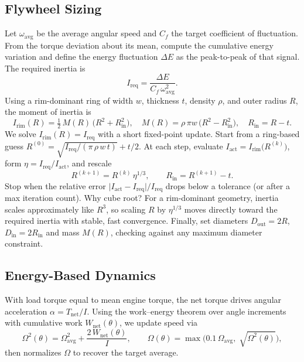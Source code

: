 \documentclass[12pt]{article}
\begin{document}
\subsection{Flywheel Sizing}
Let \(\omega_{\!\text{avg}}\) be the average angular speed and \(C_{f}\) the target coefficient of fluctuation. From the torque deviation about its mean, compute the cumulative energy variation and define the energy fluctuation \(\Delta E\) as the peak-to-peak of that signal. The required inertia is
\begin{equation}
  I_{\mathrm{req}} = \frac{\Delta E}{C_{f}\,\omega_{\!\text{avg}}^{2}}.
\end{equation}
Using a rim-dominant ring of width \(w\), thickness \(t\), density \(\rho\), and outer radius \(R\), the moment of inertia is
\begin{equation}
  I_{\mathrm{rim}}(R) = \tfrac{1}{2}\,M(R)\,\bigl(R^{2}+R_{\mathrm{in}}^{2}\bigr),\quad M(R)=\rho\,\pi w\,\bigl(R^{2}-R_{\mathrm{in}}^{2}\bigr),\quad R_{\mathrm{in}}=R-t.
\end{equation}
We solve \(I_{\mathrm{rim}}(R)=I_{\mathrm{req}}\) with a short fixed-point update. Start from a ring-based guess
\(R^{(0)} = \sqrt{I_{\mathrm{req}}/(\pi\,\rho\,w\,t)} + t/2\). At each step, evaluate
\(I_{\mathrm{act}} = I_{\mathrm{rim}}\bigl(R^{(k)}\bigr)\), form \(\eta = I_{\mathrm{req}}/I_{\mathrm{act}}\), and rescale
\begin{equation}
  R^{(k+1)} = R^{(k)}\,\eta^{1/3},\qquad R_{\mathrm{in}}=R^{(k+1)}-t.
\end{equation}
Stop when the relative error \(\lvert I_{\mathrm{act}}-I_{\mathrm{req}}\rvert/I_{\mathrm{req}}\) drops below a tolerance (or after a max iteration count).
Why cube root? For a rim-dominant geometry, inertia scales approximately like \(R^{3}\), so scaling \(R\) by \(\eta^{1/3}\) moves directly toward the required inertia with stable, fast convergence.
Finally, set diameters \(D_{\mathrm{out}}=2R\), \(D_{\mathrm{in}}=2R_{\mathrm{in}}\) and mass \(M(R)\), checking against any maximum diameter constraint.

\subsection{Energy-Based Dynamics}
With load torque equal to mean engine torque, the net torque drives angular acceleration \(\alpha = T_{\text{net}}/I\). Using the work--energy theorem over angle increments with cumulative work \(W_{\text{net}}(\theta)\), we update speed via
\begin{equation}
  \Omega^{2}(\theta) = \Omega_{\!\text{avg}}^{2} + \frac{2\,W_{\text{net}}(\theta)}{I},\qquad \Omega(\theta) = \max\bigl(0.1\,\Omega_{\!\text{avg}},\; \sqrt{\Omega^{2}(\theta)}\bigr),
\end{equation}
then normalizes \(\Omega\) to recover the target average.
\end{document}
